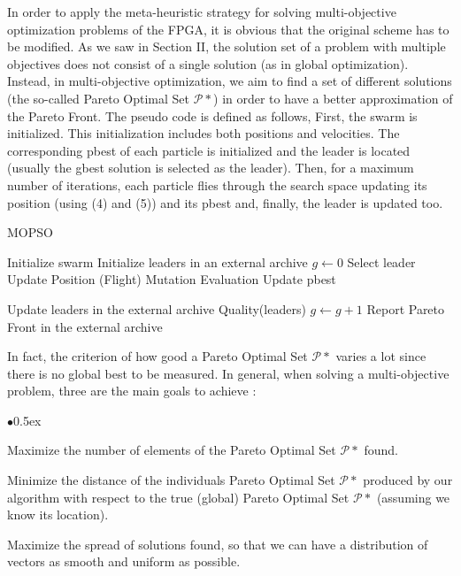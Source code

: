 \documentclass[12pt, runningheads,a4paper]{llncs}
\begin{document}
In order to apply the meta-heuristic strategy for solving multi-objective optimization problems of the FPGA, it is obvious that the original scheme has to be modified. As we saw in Section II, the solution set of a problem with multiple objectives does not consist of a single solution (as in global optimization). Instead, in multi-objective optimization, we aim to find a set of different solutions (the so-called Pareto Optimal Set $\mathcal{P}*$) in order to have a better approximation of the Pareto Front. 
The pseudo code is defined as follows, First, the swarm is initialized. This initialization includes both positions and velocities. The corresponding pbest of each particle is initialized and the leader is located (usually the gbest solution is selected as the leader). Then, for a maximum number of iterations, each particle flies through the search space updating its position (using (4) and (5)) and its pbest and, finally, the leader is updated too.
\begin{algorithm}
\footnotesize

\caption{MOPSO}\label{ourmlo}
\begin{algorithmic}[1]
	\State Initialize swarm
	\State Initialize leaders in an external archive
	\State $g \gets 0$
		\State Select leader
		\State Update Position (Flight)
		\State Mutation
		\State Evaluation
		\State Update pbest

	   \EndFor
		\State Update leaders in the external archive
		\State Quality(leaders)
		\State $g \gets g+1$
	\EndWhile
	\State Report Pareto Front in the external archive
\end{algorithmic}
\end{algorithm}

In fact, the criterion of how good a Pareto Optimal Set $\mathcal{P}*$ varies a lot since there is no global best to be measured. In general, when solving a multi-objective problem, three are the main goals to achieve \cite{mocompare}:

\begin{list}{$\bullet$}{\itemsep 0.5ex}

\item Maximize the number of elements of the Pareto Optimal Set $\mathcal{P}*$ found.
\item Minimize the distance of the individuals Pareto Optimal Set $\mathcal{P}*$ produced by our algorithm with respect to the true (global) Pareto Optimal Set $\mathcal{P}*$ (assuming we know its location).
\item Maximize the spread of solutions found, so that we can have a distribution of vectors as smooth and uniform as possible.


\end{list}
\end{document}
